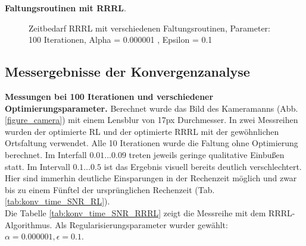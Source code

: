 \documentclass[a4paper,12pt]{article}
\begin{document}
\textbf{Faltungsroutinen mit RRRL}.

\begin{figure}[htbp]
\caption{Zeitbedarf RRRL mit verschiedenen Faltungsroutinen, Parameter: 100
Iterationen, Alpha = 0.000001 , Epsilon = 0.1 }%
\label{figure_zeit_rrrl}
\end{figure}









 
\subsection{Messergebnisse der Konvergenzanalyse}

\textbf{Messungen bei 100 Iterationen und verschiedener Optimierungsparameter.}
Berechnet wurde das Bild des Kameramanns (Abb. \ref{figure_camera}) mit einem Lensblur von 17px Durchmesser. In zwei Messreihen wurden der optimierte
RL und der optimierte RRRL mit der gewöhnlichen Ortsfaltung verwendet. 
Alle 10 Iterationen wurde die Faltung ohne Optimierung berechnet.
Im Interfall $0.01\ldots0.09$ treten jeweils geringe qualitative Einbußen statt.
Im Intervall $0.1\ldots0.5$ ist das Ergebnis visuell bereits deutlich
verschlechtert. Hier sind immerhin deutliche Einsparungen in der Rechenzeit
möglich und zwar bis zu einem Fünftel der ursprünglichen Rechenzeit
(Tab. \ref{tab:konv_time_SNR_RL}).
\\
Die Tabelle \ref{tab:konv_time_SNR_RRRL} zeigt die Messreihe mit dem
RRRL-Algorithmus. Als Regularisierungsparameter wurder gewählt: 
$\alpha = 0.000001, \epsilon = 0.1$.
\end{document}

